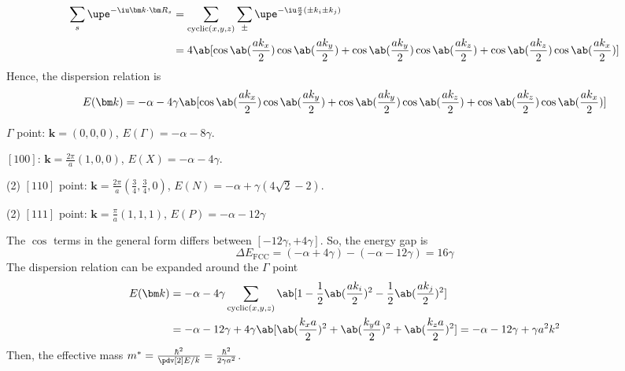 \begin{solution}[$\text{i} = \text{BCC}$, $\text{ii} = \text{FCC}$]
\begin{enumext}[label = (\alph*\textsubscript{\roman{case}})]
    \begin{align*}
      \sum_s \upe^{-\iu \bm k \cdot \bm R_s} &
    = \sum_{\text{cyclic}(x,y,z)} \sum_\pm
      \upe^{-\iu\frac a2(\pm k_i\pm k_j)} \\ &
    = 4\ab[
        \cos\ab(\frac{ak_x}2) \cos\ab(\frac{ak_y}2) +
        \cos\ab(\frac{ak_y}2) \cos\ab(\frac{ak_z}2) +
        \cos\ab(\frac{ak_z}2) \cos\ab(\frac{ak_x}2) ]
    \end{align*}
    Hence, the dispersion relation is
    \[
      E(\bm k) = -\alpha - 4\gamma \ab[
        \cos\ab(\frac{ak_x}2) \cos\ab(\frac{ak_y}2) +
        \cos\ab(\frac{ak_y}2) \cos\ab(\frac{ak_z}2) +
        \cos\ab(\frac{ak_z}2) \cos\ab(\frac{ak_x}2) ]
    \]
    \item \begin{enumext*}[columns = 2, label = \roman*.]
      \item $\Gamma$ point: $\bm k = (0,0,0)$,
      $E(\Gamma) = -\alpha - 8\gamma$.
      \item $[100]$: $\bm k = \frac{2\pi}{a}(1, 0, 0)$,
      $E(X) = -\alpha - 4\gamma$.
      \item(2) $[110]$ point: $\bm k = \frac{2\pi}{a}(\frac34, \frac34, 0)$,
      $E(N) = -\alpha + \gamma(4\sqrt2 - 2)$.
      \item(2) $[111]$ point: $\bm k = \frac\pi a(1, 1, 1)$,
      $E(P) = -\alpha - 12\gamma$
    \end{enumext*}
    \item The $\cos$ terms in the general form differs between
    $[-12\gamma, +4\gamma]$. So, the energy gap is
    \[
      \Delta E_\text{FCC} = (-\alpha + 4\gamma) - (-\alpha - 12\gamma)
    = 16\gamma
    \]
    The dispersion relation can be expanded around the $\Gamma$ point
    \begin{align*}
      E(\bm k) & = -\alpha - 4\gamma\sum_{\text{cyclic}(x,y,z)}\ab[1
        - \frac12\ab(\frac{ak_i}{2})^2
        - \frac12\ab(\frac{ak_j}{2})^2 ]\\ &
    = -\alpha - 12\gamma + 4\gamma\ab[
        \ab(\frac{k_xa}2)^2 + \ab(\frac{k_ya}2)^2 + \ab(\frac{k_za}2)^2]
    = -\alpha - 12\gamma + \gamma a^2k^2
    \end{align*}
    Then, the effective mass $m^* = \frac{\hbar^2}{\pdv[2]E/k}
    = \frac{\hbar^2}{2\gamma a^2}$.
  \end{enumext}
\end{solution}
